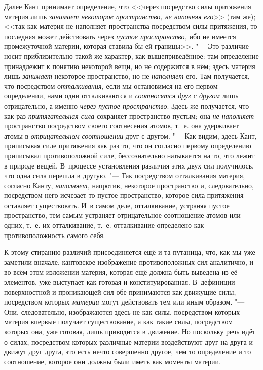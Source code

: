 Далее Кант принимает определение, что <<через посредство силы притяжения
материя лишь {\em занимает некоторое пространство, не
наполняя его}>> (там же); <<так как материя не наполняет пространства
посредством силы притяжения, то последняя может действовать через
{\em пустое пространство,} ибо не имеется промежуточной
материи, которая ставила бы ей границы>>. "--- Это различие носит
приблизительно такой же характер, как вышеприведённое: там определение
принадлежит к понятию некоторой вещи, но не содержится в нём; здесь материя
лишь {\em занимает} некоторое пространство, но не
{\em наполняет} его. Там получается, что посредством
{\em отталкивания,} если мы остановимся на его первом
определении, нами одни отталкиваются и {\em соотносятся
друг с другом} лишь отрицательно, а именно {\em через
пустое пространство}. Здесь же получается, что как раз
{\em притягательная сила} сохраняет пространство
пустым; она {\em не наполняет} пространство посредством
своего соотнесения атомов, т.~е. она удерживает атомы в {\em отрицательном}
{\em соотношении} друг с другом. "--- Как видим, здесь
Кант, приписывая силе притяжения как раз то, что он согласно первому
определению приписывал противоположной силе, бессознательно натыкается на
то, что лежит в природе вещей. В~процессе установления различия этих двух
сил получилось, что одна сила перешла в другую. "--- Так посредством
отталкивания материя, согласно Канту, {\em наполняет,}
напротив, некоторое пространство и, следовательно, посредством него
исчезает то пустое пространство, которое сила притяжения оставляет
существовать. И~в самом деле, отталкивание, устраняя пустое пространство,
тем самым устраняет отрицательное соотношение атомов или одних, т.~е. их
отталкивание, т.~е. отталкивание определено как противоположность самого себя.

К этому стиранию различий присоединяется ещё и та путаница, что, как мы уже
заметили вначале, кантовское изображение противоположных сил аналитично, и
во всём этом изложении материя, которая ещё должна быть выведена из её
элементов, уже выступает как готовая и конституированная. В~дефиниции
поверхностной и проникающей сил обе принимаются как движущие силы,
посредством которых {\em материи} могут действовать тем
или иным образом. "--- Они, следовательно, изображаются здесь не как силы,
посредством которых материя впервые получает существование, а как такие
силы, посредством которых она, уже готовая, лишь приводится в движение. Но
поскольку речь идёт о силах, посредством которых различные материи
воздействуют друг на друга и движут друг друга, это есть нечто совершенно
другое, чем то определение и то соотношение, которое они должны были иметь
как моменты материи.


